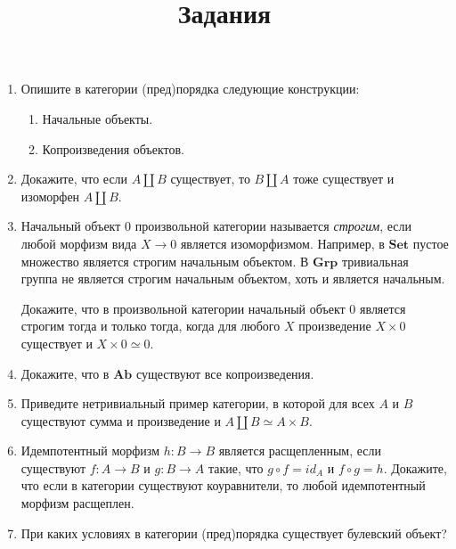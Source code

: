 \documentclass[draft]{article}
\newcommand{\cat}[1]{\mathbf{#1}}
\newcommand{\Set}{\cat{Set}}
\newcommand{\Grp}{\cat{Grp}}
\newcommand{\Ab}{\cat{Ab}}
\begin{document}
\title{Задания}
\maketitle

\begin{enumerate}

\item Опишите в категории (пред)порядка следующие конструкции:
\begin{enumerate}
\item Начальные объекты.
\item Копроизведения объектов.
\end{enumerate}

\item Докажите, что если $A \amalg B$ существует, то $B \amalg A$ тоже существует и изоморфен $A \amalg B$.

\item Начальный объект $0$ произвольной категории называется \emph{строгим}, если любой морфизм вида $X \to 0$ является изоморфизмом.
Например, в $\Set$ пустое множество является строгим начальным объектом.
В $\Grp$ тривиальная группа не является строгим начальным объектом, хоть и является начальным.

Докажите, что в произвольной категории начальный объект $0$ является строгим тогда и только тогда, когда для любого $X$ произведение $X \times 0$ существует и $X \times 0 \simeq 0$.

\item Докажите, что в $\Ab$ существуют все копроизведения.

\item Приведите нетривиальный пример категории, в которой для всех $A$ и $B$ существуют сумма и произведение и $A \amalg B \simeq A \times B$.

\item Идемпотентный морфизм $h : B \to B$ является расщепленным, если существуют $f : A \to B$ и $g : B \to A$ такие, что $g \circ f = id_A$ и $f \circ g = h$.
Докажите, что если в категории существуют коуравнители, то любой идемпотентный морфизм расщеплен.

\item При каких условиях в категории (пред)порядка существует булевский объект?


\end{enumerate}
\end{document}
